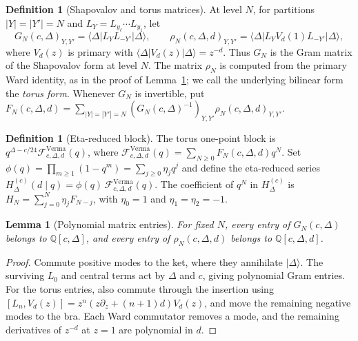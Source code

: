 \documentclass[twoside,10pt]{article}
\numberwithin{equation}{section}
\theoremstyle{slbody}
\newtheorem{lemma}[theorem]{Lemma}
\theoremstyle{definition}
\newtheorem{definition}[theorem]{Definition}
\theoremstyle{remark}
\begin{document}
\begin{definition}[Shapovalov and torus matrices]\label{def:matrices}
At level \(N\), for partitions \(|Y|=|Y'|=N\) and \(L_Y=L_{y_\ell}\cdots L_{y_1}\), let
\[
 G_N(c,\Delta)_{Y,Y'}=\langle\Delta|L_YL_{-Y'}|\Delta\rangle,
 \qquad
 \rho_N(c,\Delta,d)_{Y,Y'}=\langle\Delta|L_YV_d(1)L_{-Y'}|\Delta\rangle,
\]
where \(V_d(z)\) is primary with \(\langle\Delta|V_d(z)|\Delta\rangle=z^{-d}\).
Thus \(G_N\) is the Gram matrix of the Shapovalov form at level \(N\).  The
matrix \(\rho_N\) is computed from the primary Ward identity, as in the proof of Lemma~\ref{lem:polynomial-entries}; we call the
underlying bilinear form the \emph{torus form}.  Whenever \(G_N\) is invertible, put
\(F_N(c,\Delta,d)=\sum_{|Y|=|Y'|=N}(G_N(c,\Delta)^{-1})_{Y,Y'}\rho_N(c,\Delta,d)_{Y,Y'}\).
\end{definition}

\begin{definition}[Eta-reduced block]\label{def:eta-reduced}
The torus one-point block is
\(q^{\Delta-c/24}\mathcal F^{\mathrm{Verma}}_{c,\Delta,d}(q)\), where
\(\mathcal F^{\mathrm{Verma}}_{c,\Delta,d}(q)=\sum_{N\geq0}F_N(c,\Delta,d)q^N\).
Set \(\phi(q)=\prod_{m\geq1}(1-q^m)=\sum_{j\geq0}\eta_jq^j\) and define the
eta-reduced series
\(H_\Delta^{(c)}(d\mid q)=\phi(q)\,\mathcal F^{\mathrm{Verma}}_{c,\Delta,d}(q)\).
The coefficient of \(q^N\) in \(H_\Delta^{(c)}\) is \(H_N=\sum_{j=0}^N\eta_jF_{N-j}\),
with \(\eta_0=1\) and \(\eta_1=\eta_2=-1\).
\end{definition}

\begin{lemma}[Polynomial matrix entries]\label{lem:polynomial-entries}
For fixed \(N\), every entry of \(G_N(c,\Delta)\) belongs to
\(\mathbb Q[c,\Delta]\), and every entry of
\(\rho_N(c,\Delta,d)\) belongs to \(\mathbb Q[c,\Delta,d]\).
\end{lemma}

\begin{proof}
Commute positive modes to the ket, where they annihilate
\(|\Delta\rangle\). The surviving \(L_0\) and central terms act by
\(\Delta\) and \(c\), giving polynomial Gram entries. For the torus entries,
also commute through the insertion using
\([L_n,V_d(z)]=z^n(z\partial_z+(n+1)d)V_d(z)\), and move the remaining
negative modes to the bra. Each Ward commutator removes a mode, and the
remaining derivatives of \(z^{-d}\) at \(z=1\) are polynomial in \(d\).
\end{proof}
\end{document}
